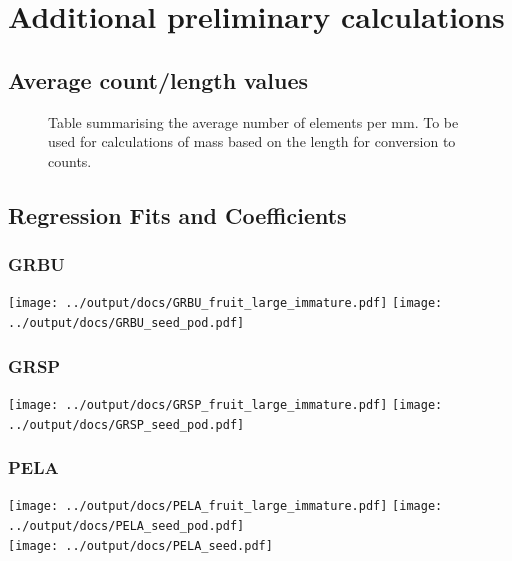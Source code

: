 \documentclass[10pt]{book} %
\begin{document}
\chapter{Additional preliminary calculations}

\section{Average count/length values}


\begin{figure}[h!]
\begin{center}

\end{center}
\caption{Table summarising the average number of elements per mm. To be used for calculations of mass based on the length for conversion to counts.}
\end{figure}


\section{Regression Fits and Coefficients}
\subsection*{GRBU}
\begin{center}
\texttt{[image: ../output/docs/GRBU\_fruit\_large\_immature.pdf]}
\texttt{[image: ../output/docs/GRBU\_seed\_pod.pdf]}
\end{center}

\subsection{GRSP}
\begin{center}
\texttt{[image: ../output/docs/GRSP\_fruit\_large\_immature.pdf]}
\texttt{[image: ../output/docs/GRSP\_seed\_pod.pdf]}
\end{center}

\subsection{PELA}
\begin{center}
\texttt{[image: ../output/docs/PELA\_fruit\_large\_immature.pdf]}
\texttt{[image: ../output/docs/PELA\_seed\_pod.pdf]}\\
\texttt{[image: ../output/docs/PELA\_seed.pdf]}
\end{center}
\end{document}
